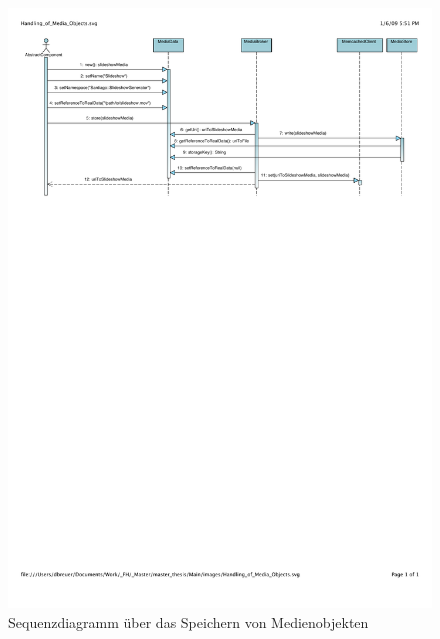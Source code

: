   \begin{figure}
    \centering
      \includegraphics[width=\textwidth]{images/Handling_of_Media_Objects_write.pdf}
    \caption{Sequenzdiagramm über das Speichern von Medienobjekten}
    \label{fig:images_Handling_of_Media_Objects}
  \end{figure}

